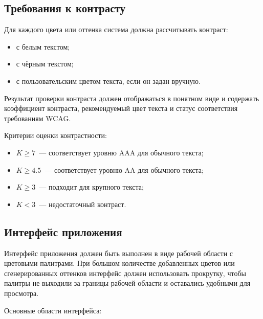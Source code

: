 \subsection*{Требования к контрасту}

Для каждого цвета или оттенка система должна рассчитывать контраст:

\begin{itemize}
    \item с белым текстом;
    \item с чёрным текстом;
    \item с пользовательским цветом текста, если он задан вручную.
\end{itemize}

Результат проверки контраста должен отображаться в понятном виде и содержать коэффициент контраста, рекомендуемый цвет текста и статус соответствия требованиям WCAG.

Критерии оценки контрастности:

\begin{itemize}
    \item \(K \geq 7\)~--- соответствует уровню AAA для обычного текста;
    \item \(K \geq 4.5\)~--- соответствует уровню AA для обычного текста;
    \item \(K \geq 3\)~--- подходит для крупного текста;
    \item \(K < 3\)~--- недостаточный контраст.
\end{itemize}

\subsection*{Интерфейс приложения}

Интерфейс приложения должен быть выполнен в виде рабочей области с цветовыми палитрами. При большом количестве добавленных цветов или сгенерированных оттенков интерфейс должен использовать прокрутку, чтобы палитры не выходили за границы рабочей области и оставались удобными для просмотра.

Основные области интерфейса:

